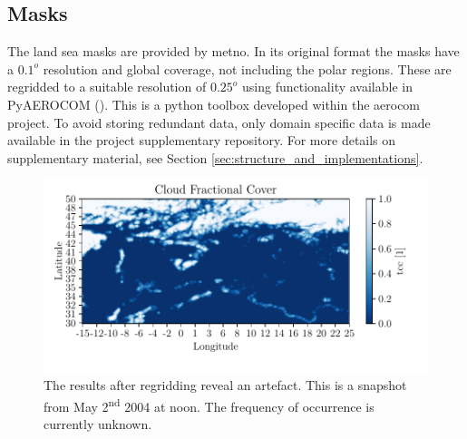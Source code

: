 \subsection{Masks} \label{sec:mask}
The land sea masks are provided by \acrfull{metno}. In its original format the masks have a $0.1^o$ resolution and global coverage, not including the polar regions. These are regridded to a suitable resolution of $0.25^o$ using functionality available in PyAEROCOM (\cite{pyaerocom}). %
This is a python toolbox developed within the \acrfull{aerocom} project. To avoid storing redundant data, only domain specific data is made available in the project supplementary repository. For more details on supplementary material, see Section \ref{sec:structure_and_implementations}.
\begin{figure}
    \centering
    \includegraphics{python_figs/example_artefact.pdf}
    \caption[Artefact in European Cloud Cover dataset.]{The results after regridding reveal an artefact. This is a snapshot from May 2\textsuperscript{nd} 2004 at noon. The frequency of occurrence is currently unknown.}
    \label{fig:example_artefact}
\end{figure}

